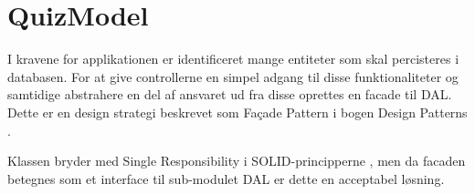 \section{QuizModel}

I kravene for applikationen er identificeret mange entiteter som skal percisteres i databasen. For at give controllerne en  simpel adgang til disse funktionaliteter og samtidige abstrahere en del af ansvaret ud fra disse oprettes en facade til DAL. Dette er en design strategi beskrevet som Fa\c{c}ade Pattern i bogen Design Patterns \citep[s. 186-]{gof}.

Klassen bryder med Single Responsibility i SOLID-principperne \citep{wikiSolid}, men da facaden betegnes som et interface til sub-modulet DAL er dette en acceptabel løsning.